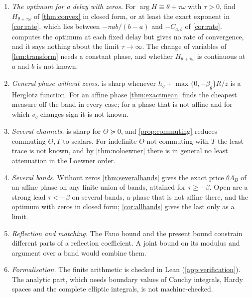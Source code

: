 \begin{enumerate}
\item[(1)] \emph{The optimum for a delay with zeros.} For
$\arg H\equiv\theta+\tau\omega$ with $\tau>0$, find $H_{\theta+\tau\omega}$ of
\cref{thm:convex} in closed form, or at least the exact exponent in
\cref{cor:rate}, which lies between $-\pi ab/(b-a)$ and
$-C_{a,b}$ of \cref{cor:rate}.  computes the optimum at each fixed delay
but gives no rate of convergence, and it says nothing about the limit
$\tau\to\infty$. The change of variables of \cref{lem:transform} needs a
constant phase, and whether $H_{\theta+\tau\omega}$ is continuous at $a$ and $b$
is not known.
\item[(2)] \emph{General phase without zeros.}  is sharp
whenever $h_g+\max\{0,-\beta_g\}R/z$ is a Herglotz function. For an affine
phase \cref{thm:exactmean} finds the cheapest measure off the band in every
case; for a phase that is not affine and for which $v_g$ changes sign it is
not known.
\item[(3)] \emph{Several channels.}  is sharp for
$\Theta\succeq0$, and \cref{prop:commuting} reduces commuting $\Theta,T$ to
scalars. For indefinite $\Theta$ not commuting with $T$ the least trace is not
known, and by
\cref{thm:noloewner} there is in general no least attenuation in the
Loewner order.
\item[(4)] \emph{Several bands.} Without zeros \cref{thm:severalbands}
gives the exact price $\theta\Lambda_B$ of an affine phase on any finite
union of bands, attained for $\tau\ge-\beta$. Open are a strong lead
$\tau<-\beta$ on several bands, a phase that is not affine there, and the
optimum with zeros in closed form; \cref{cor:allbands} gives the last only
as a limit.
\item[(5)] \emph{Reflection and matching.} The Fano bound \cite{fano} and the
present bound constrain different parts of a reflection coefficient. A
joint bound on its modulus and argument over a band would combine them.
\item[(6)] \emph{Formalisation.} The finite arithmetic is checked in Lean
(\cref{app:verification}). The analytic part, which needs boundary values of
Cauchy integrals, Hardy spaces and the complete elliptic integrals, is not
machine-checked.
\end{enumerate}
